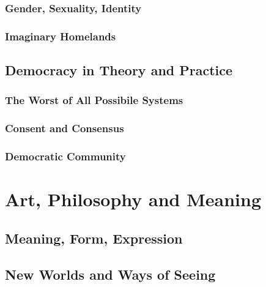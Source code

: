 \documentclass[
  12pt, openany]{book}
\begin{document}
\hypertarget{gender-sexuality-identity}{%
\subsection{Gender, Sexuality, Identity}\label{gender-sexuality-identity}}

\hypertarget{imaginary-homelands}{%
\subsection{Imaginary Homelands}\label{imaginary-homelands}}

\hypertarget{democracy-in-theory-and-practice}{%
\section{Democracy in Theory and Practice}\label{democracy-in-theory-and-practice}}

\hypertarget{the-worst-of-all-possibile-systems}{%
\subsection{The Worst of All Possibile Systems}\label{the-worst-of-all-possibile-systems}}

\hypertarget{consent-and-consensus}{%
\subsection{Consent and Consensus}\label{consent-and-consensus}}

\hypertarget{democratic-community}{%
\subsection{Democratic Community}\label{democratic-community}}

\hypertarget{art-philosophy-and-meaning}{%
\chapter{Art, Philosophy and Meaning}\label{art-philosophy-and-meaning}}

\hypertarget{meaning-form-expression}{%
\section{Meaning, Form, Expression}\label{meaning-form-expression}}

\hypertarget{new-worlds-and-ways-of-seeing}{%
\section{New Worlds and Ways of Seeing}\label{new-worlds-and-ways-of-seeing}}
\end{document}
